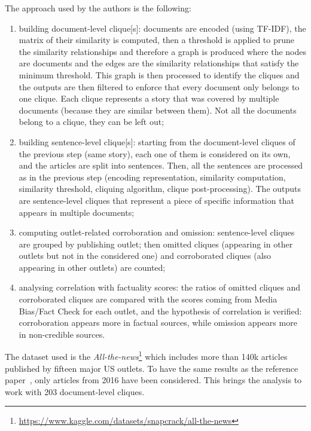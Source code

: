 The approach used by the authors is the following:
\begin{enumerate}
    \item building document-level \gls{clique}[s]: documents are encoded (using TF-IDF), the matrix of their similarity is computed, then a threshold is applied to prune the similarity relationships and therefore a graph is produced where the nodes are documents and the edges are the similarity relationships that satisfy the minimum threshold. This graph is then processed to identify the cliques and the outputs are then filtered to enforce that every document only belongs to one clique. Each clique represents a story that was covered by multiple documents (because they are similar between them). Not all the documents belong to a clique, they can be left out;
    \item building sentence-level \gls{clique}[s]: starting from the document-level cliques of the previous step (same story), each one of them is considered on its own, and the articles are split into sentences. Then, all the sentences are processed as in the previous step (encoding representation, similarity computation, similarity threshold, cliquing algorithm, clique post-processing). The outputs are sentence-level cliques that represent a piece of specific information that appears in multiple documents; 
    \item computing outlet-related corroboration and omission: sentence-level cliques are grouped by publishing outlet; then omitted cliques (appearing in other outlets but not in the considered one) and corroborated cliques (also appearing in other outlets) are counted;
    \item analysing correlation with factuality scores: the ratios of omitted cliques and corroborated cliques are compared with the scores coming from Media Bias/Fact Check for each outlet, and the hypothesis of correlation is verified: corroboration appears more in factual sources, while omission appears more in non-credible sources.
\end{enumerate}

The dataset used is the \emph{All-the-news}\footnote{\url{https://www.kaggle.com/datasets/snapcrack/all-the-news}} which includes more than 140k articles published by fifteen major US outlets. To have the same results as the reference paper~\citep{bountouridis2018explaining}, only articles from 2016 have been considered. This brings the analysis to work with 203 document-level cliques. 

